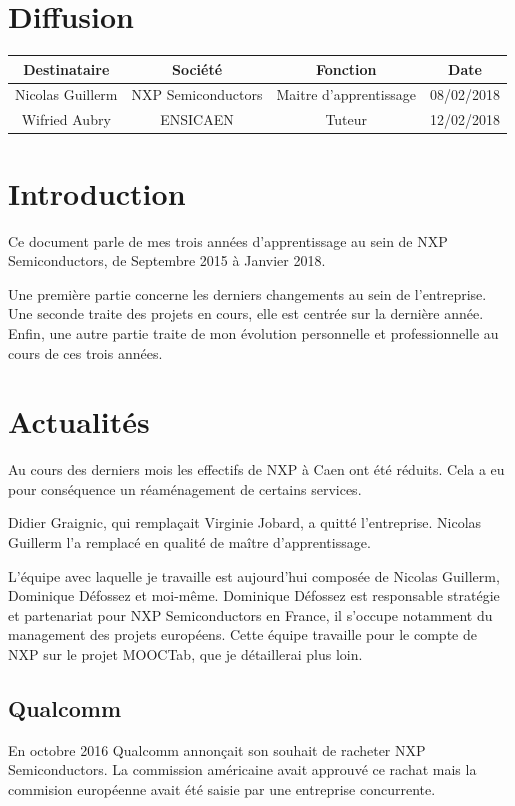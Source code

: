 \documentclass[french,12pt,a4paper,titlepage,openright,openbib]{report}
\begin{document}
{\let \clearpage \relax \chapter*{Diffusion}}
\begin{table}[ht]
	\label{tab:diffusion}
	\centering
	\begin{tabular}{|c|c|c|c|}
		\hline
		{\bf Destinataire} & {\bf Société}      & {\bf Fonction}   		 & {\bf Date}\\
		\hline
		Nicolas Guillerm   & NXP Semiconductors & Maitre d'apprentissage & 08/02/2018 \\
		\hline
		Wifried Aubry      & ENSICAEN 			& Tuteur				 & 12/02/2018 \\
		\hline
	\end{tabular}
\end{table}

\chapter{Introduction}
Ce document parle de mes trois années d'apprentissage au sein de NXP Semiconductors, de Septembre 2015 à Janvier 2018.

Une première partie concerne les derniers changements au sein de l'entreprise.
Une seconde traite des projets en cours, elle est centrée sur la dernière année.
Enfin, une autre partie traite de mon évolution personnelle et professionnelle au cours de ces trois années.

\chapter{Actualités}
Au cours des derniers mois les effectifs de NXP à Caen ont été réduits. Cela a eu pour conséquence un réaménagement de certains services.

Didier Graignic, qui remplaçait Virginie Jobard, a quitté l'entreprise. Nicolas Guillerm l'a remplacé en qualité de maître d'apprentissage.

L'équipe avec laquelle je travaille est aujourd'hui composée de Nicolas Guillerm, Dominique Défossez et moi-même. Dominique Défossez est responsable stratégie et partenariat pour NXP Semiconductors en France, il s'occupe notamment du management des projets européens.
Cette équipe travaille pour le compte de NXP sur le projet MOOCTab, que je détaillerai plus loin.
\section{Qualcomm}
En octobre 2016 Qualcomm annonçait son souhait de racheter NXP Semiconductors. La commission américaine avait approuvé ce rachat mais la commision européenne avait été saisie par une entreprise concurrente.
\end{document}
